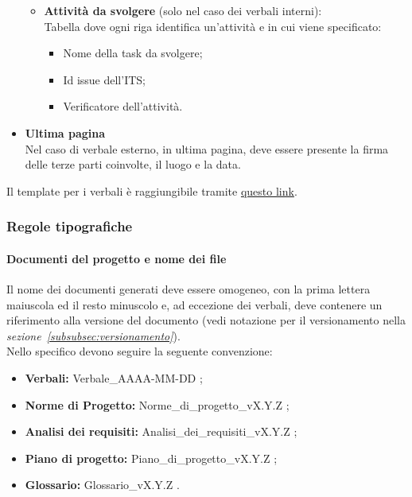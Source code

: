 \begin{itemize}
\begin{itemize}
            \item \textbf{Attività da svolgere} (solo nel caso dei verbali interni): \\
            Tabella dove ogni riga identifica un'attività e in cui viene specificato:
                \begin{itemize}
                    \item Nome della task da svolgere;
                    \item Id issue dell'ITS;
                    \item Verificatore dell'attività.
                \end{itemize}
        \end{itemize}
    \item \textbf{Ultima pagina} \\
        Nel caso di verbale esterno, in ultima pagina, deve essere presente la firma delle terze parti coinvolte, il luogo e la data.
\end{itemize}

Il template per i verbali è raggiungibile tramite \href{https://github.com/ByteOps-swe/Sorgente-documenti/tree/main/Documents/Verbali/Templates}{questo link}.

\subsubsection{Regole tipografiche}
\paragraph*{Documenti del progetto e nome dei file}\label{sec:NomeFile}
Il nome dei documenti generati deve essere omogeneo, con la prima lettera maiuscola ed il resto minuscolo e, ad eccezione dei verbali, deve contenere un riferimento alla versione del documento (vedi notazione per il versionamento nella \textit{sezione~\ref{subsubsec:versionamento}}). \\
Nello specifico devono seguire la seguente convenzione:
\begin{itemize}
    \item \textbf{Verbali:} Verbale\_AAAA-MM-DD ;
    \item \textbf{Norme di Progetto:} Norme\_di\_progetto\_vX.Y.Z ;
    \item \textbf{Analisi dei requisiti:} Analisi\_dei\_requisiti\_vX.Y.Z ;
    \item \textbf{Piano di progetto:} Piano\_di\_progetto\_vX.Y.Z ;
    \item \textbf{Glossario:} Glossario\_vX.Y.Z .
\end{itemize}

